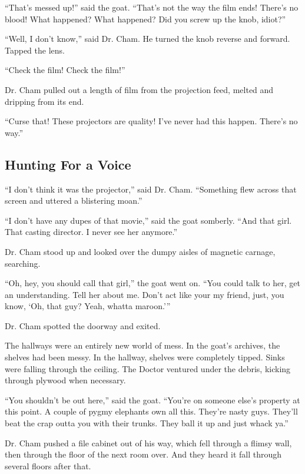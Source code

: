 \documentclass[10pt,twoside]{report}
\begin{document}
``That's messed up!'' said the goat.  ``That's not the way the film
        ends! There's no blood!  What happened?  What happened?  Did
        you screw up the knob, idiot?''

``Well, I don't know,'' said Dr. Cham.  He turned the knob reverse and
        forward. Tapped the lens.

``Check the film!  Check the film!''

Dr. Cham pulled out a length of film from the projection feed, melted
and dripping from its end.

``Curse that!  These projectors are quality!  I've never had this
happen.  There's no way.''



\subsection{Hunting For a Voice}



``I don't think it was the projector,'' said Dr. Cham.  ``Something
flew across that screen and uttered a blistering moan.''

``I don't have any dupes of that movie,'' said the goat somberly.
``And that girl.  That casting director.  I never see her anymore.''

Dr. Cham stood up and looked over the dumpy aisles of magnetic
carnage, searching.

``Oh, hey, you should call that girl,'' the goat went on. ``You could
talk to her, get an understanding. Tell her about me.  Don't act like
your my friend, just, you know, `Oh, that guy? Yeah, whatta maroon.'''

Dr. Cham spotted the doorway and exited.

The hallways were an entirely new world of mess.  In the goat's
archives, the shelves had been messy. In the hallway, shelves were
completely tipped.  Sinks were falling through the ceiling.  The
Doctor ventured under the debris, kicking through plywood when
necessary.

``You shouldn't be out here,'' said the goat.  ``You're on someone
else's property at this point. A couple of pygmy elephants own all
this.  They're nasty guys.  They'll beat the crap outta you with their
trunks.  They ball it up and just whack ya.''

Dr. Cham pushed a file cabinet out of his way, which fell through a
flimsy wall, then through the floor of the next room over.  And they
heard it fall through several floors after that.
\end{document}
